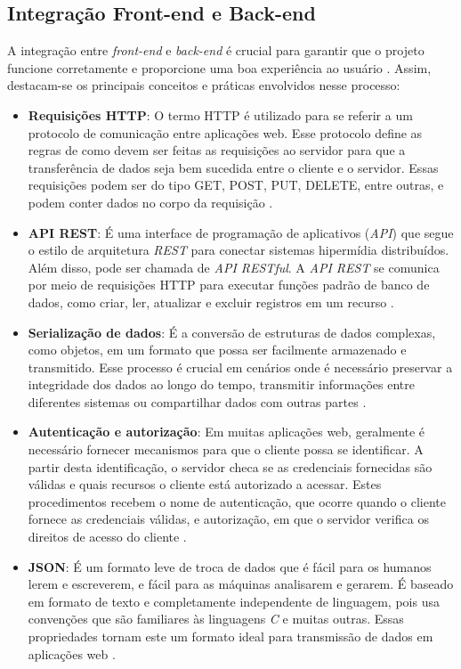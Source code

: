 \subsection{Integração Front-end e Back-end}

A integração entre \textit{front-end} e \textit{back-end} é crucial para garantir que o projeto funcione corretamente e proporcione uma boa experiência ao usuário \cite{da2024guia}. Assim, destacam-se os principais conceitos e práticas envolvidos nesse processo:

\begin{itemize}
    \item \textbf{Requisições HTTP}: O termo HTTP é utilizado para se referir a um protocolo de comunicação entre aplicações web. Esse protocolo define as regras de como devem ser feitas as requisições ao servidor para que a transferência de dados seja bem sucedida entre o cliente e o servidor. Essas requisições podem ser do tipo GET, POST, PUT, DELETE, entre outras, e podem conter dados no corpo da requisição \cite{portilho2021desenvolvimento}.
    \item \textbf{API REST}: É uma interface de programação de aplicativos (\textit{API}) que segue o estilo de arquitetura \textit{REST} para conectar sistemas hipermídia distribuídos. Além disso, pode ser chamada de \textit{API RESTful}. A \textit{API REST} se comunica por meio de requisições HTTP para executar funções padrão de banco de dados, como criar, ler, atualizar e excluir registros em um recurso \cite{ibm2025}.
    \item \textbf{Serialização de dados}: É a conversão de estruturas de dados complexas, como objetos, em um formato que possa ser facilmente armazenado e transmitido. Esse processo é crucial em cenários onde é necessário preservar a integridade dos dados ao longo do tempo, transmitir informações entre diferentes sistemas ou compartilhar dados com outras partes \cite{castilhos2024analise}.
    \item \textbf{Autenticação e autorização}: Em muitas aplicações web, geralmente é necessário fornecer mecanismos para que o cliente possa se identificar. A partir desta identificação, o servidor checa se as credenciais fornecidas são válidas e quais recursos o cliente está autorizado a acessar. Estes procedimentos recebem o nome de autenticação, que ocorre quando o cliente fornece as credenciais válidas, e autorização, em que o servidor verifica os direitos de acesso do cliente \cite{oliveira2014desenvolvimento}.
    \item \textbf{JSON}: É um formato leve de troca de dados que é fácil para os humanos lerem e escreverem, e fácil para as máquinas analisarem e gerarem. É baseado em formato de texto e completamente independente de linguagem, pois usa convenções que são familiares às linguagens \textit{C} e muitas outras. Essas propriedades tornam este um formato ideal para transmissão de dados em aplicações web \cite{json2025}.
\end{itemize}

